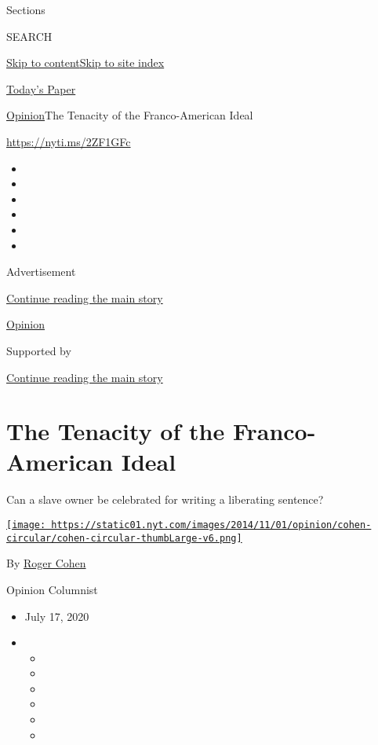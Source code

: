 Sections

SEARCH

\protect\hyperlink{site-content}{Skip to
content}\protect\hyperlink{site-index}{Skip to site index}

\href{https://myaccount.nytimes.com/auth/login?response_type=cookie\&client_id=vi}{}

\href{https://www.nytimes.com/section/todayspaper}{Today's Paper}

\href{/section/opinion}{Opinion}\textbar{}The Tenacity of the
Franco-American Ideal

\href{https://nyti.ms/2ZF1GFc}{https://nyti.ms/2ZF1GFc}

\begin{itemize}
\item
\item
\item
\item
\item
\item
\end{itemize}

Advertisement

\protect\hyperlink{after-top}{Continue reading the main story}

\href{/section/opinion}{Opinion}

Supported by

\protect\hyperlink{after-sponsor}{Continue reading the main story}

\hypertarget{the-tenacity-of-the-franco-american-ideal}{%
\section{The Tenacity of the Franco-American
Ideal}\label{the-tenacity-of-the-franco-american-ideal}}

Can a slave owner be celebrated for writing a liberating sentence?

\href{https://www.nytimes.com/by/roger-cohen}{\texttt{[image: https://static01.nyt.com/images/2014/11/01/opinion/cohen-circular/cohen-circular-thumbLarge-v6.png]}}

By \href{https://www.nytimes.com/by/roger-cohen}{Roger Cohen}

Opinion Columnist

\begin{itemize}
\item
  July 17, 2020
\item
  \begin{itemize}
  \item
  \item
  \item
  \item
  \item
  \item
  \end{itemize}
\end{itemize}

